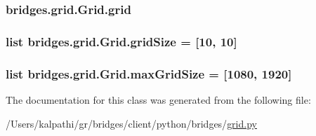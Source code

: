 \subsubsection[{grid}]{\setlength{\rightskip}{0pt plus 5cm}bridges.\+grid.\+Grid.\+grid}\label{classbridges_1_1grid_1_1_grid_a609e662d769bbda34e88dd2be0307f4f}
\hypertarget{classbridges_1_1grid_1_1_grid_adce099bc682fc79310e90619d791342f}{}
\subsubsection[{grid\+Size}]{\setlength{\rightskip}{0pt plus 5cm}list bridges.\+grid.\+Grid.\+grid\+Size = \mbox{[}10, 10\mbox{]}\hspace{0.3cm}{\ttfamily [static]}}\label{classbridges_1_1grid_1_1_grid_adce099bc682fc79310e90619d791342f}
\hypertarget{classbridges_1_1grid_1_1_grid_a5585d466b6738e4eee71a7dda56b4153}{}
\subsubsection[{max\+Grid\+Size}]{\setlength{\rightskip}{0pt plus 5cm}list bridges.\+grid.\+Grid.\+max\+Grid\+Size = \mbox{[}1080, 1920\mbox{]}\hspace{0.3cm}{\ttfamily [static]}}\label{classbridges_1_1grid_1_1_grid_a5585d466b6738e4eee71a7dda56b4153}


The documentation for this class was generated from the following file\+:\begin{DoxyCompactItemize}
\item 
/\+Users/kalpathi/gr/bridges/client/python/bridges/\hyperlink{grid_8py}{grid.\+py}\end{DoxyCompactItemize}
